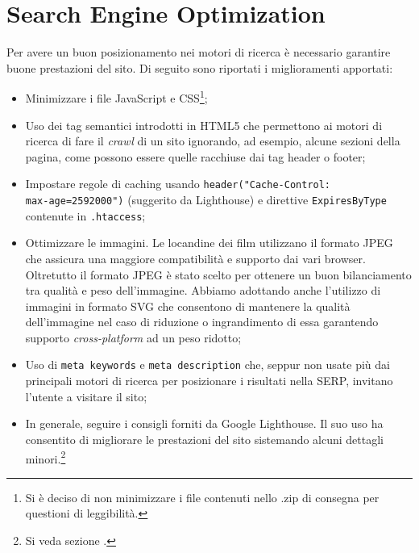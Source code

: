 \section{Search Engine Optimization}

Per avere un buon posizionamento nei motori di ricerca è necessario garantire buone prestazioni del sito. Di seguito sono riportati i miglioramenti apportati:

\begin{itemize}
    \item Minimizzare i file JavaScript e CSS\footnote{Si è deciso di non minimizzare i file contenuti nello .zip di consegna per questioni di leggibilità.};
    \item Uso dei tag semantici introdotti in HTML5 che permettono ai motori di ricerca di fare il \textit{crawl} di un sito ignorando, ad esempio, alcune sezioni della pagina, come possono essere quelle racchiuse dai tag header o footer;
    \item Impostare regole di caching usando \texttt{header("Cache-Control:\\ max-age=2592000")} (suggerito da Lighthouse) e direttive \texttt{ExpiresByType} contenute in \texttt{.htaccess};
    \item Ottimizzare le immagini. Le locandine dei film utilizzano il formato JPEG che assicura una maggiore compatibilità e supporto dai vari browser. Oltretutto il formato JPEG è stato scelto per ottenere un buon bilanciamento tra qualità e peso dell’immagine. Abbiamo adottando anche l’utilizzo di immagini in formato SVG che consentono di mantenere la qualità dell’immagine nel caso di riduzione o ingrandimento di essa garantendo supporto \textit{cross-platform} ad un peso ridotto;
    \item Uso di \texttt{meta keywords} e \texttt{meta description} che, seppur non usate più dai principali motori di ricerca per posizionare i risultati nella SERP, invitano l'utente a visitare il sito;
    \item In generale, seguire i consigli forniti da Google Lighthouse. Il suo uso ha consentito di migliorare le prestazioni del sito sistemando alcuni dettagli minori.\footnote{Si veda sezione \textit{}.}
\end{itemize}